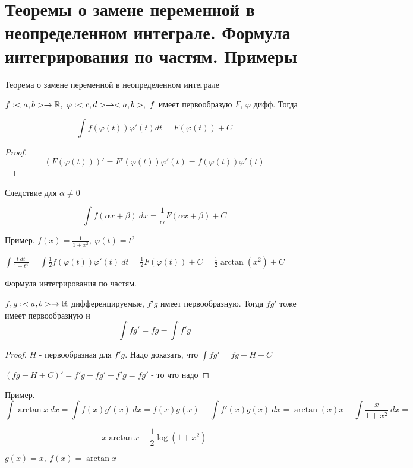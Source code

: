 \section{Теоремы о замене переменной в неопределенном интеграле. Формула интегрирования по частям. Примеры \href{https://youtu.be/p9C57KDo1Yg?t=5408}{\Walley}}

\begin{theorem}
    Теорема о замене переменной в неопределенном интеграле

    $f: <a, b> \to \mathbb{R},\ \varphi: <c, d> \to <a, b>,\ f$
    имеет первообразую $F$, $\varphi$ дифф. Тогда

    \[ \int f(\varphi(t))\varphi'(t) dt = F(\varphi(t))+C \]
\end{theorem}

\begin{proof}
    \[(F(\varphi(t)))' = F'(\varphi(t))\varphi'(t) = f(\varphi(t))\varphi'(t)\]
\end{proof}

Следствие для $\alpha \neq 0$

\[\int f(\alpha x + \beta)\ dx = \frac{1}{\alpha} F(\alpha x + \beta) + C \]

Пример. $f(x) = \frac{1}{1+x^2},\ \varphi(t) = t^2$

$\int \frac{t\ dt}{1+t^4} = \int \frac{1}{2}f(\varphi(t))\varphi'(t)\ dt
= \frac{1}{2} F(\varphi(t)) + C = \frac{1}{2} \arctan(x^2) + C$

\begin{theorem}
    Формула интегрирования по частям.

    $f, g: <a, b> \to \mathbb{R}$ дифференцируемые, $f'g$ имеет первообразную. Тогда
    $fg'$ тоже имеет первообразную и 
    \[ \int fg' = fg - \int f'g \]
\end{theorem}

\begin{proof}
    $H$ - первообразная для $f'g$. Надо доказать, что $\int fg' = fg - H + C$
    
    $(fg - H +C)' = f'g+fg'-f'g = fg'$ - то что надо
\end{proof}

Пример. \[\int \arctan x\ dx = \int f(x)g'(x)\ dx =
f(x)g(x)-\int f'(x)g(x)\ dx = \arctan(x)x - \int \frac{x}{1+x^2}\ dx = \]

\[ x\arctan x - \frac{1}{2} \log(1+x^2)\]

$g(x) = x,\ f(x) = \arctan x$